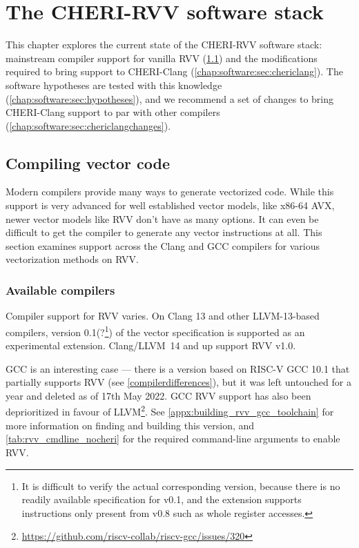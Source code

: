 \documentclass[../thesis]{subfiles}
\begin{document}
\chapter{The CHERI-RVV software stack\label{chap:software}}
This chapter explores the current state of the CHERI-RVV software stack: mainstream compiler support for vanilla RVV (\cref{chap:software:sec:compilersupport}) and the modifications required to bring support to CHERI-Clang (\cref{chap:software:sec:chericlang}).
The software hypotheses are tested with this knowledge (\cref{chap:software:sec:hypotheses}), and we recommend a set of changes to bring CHERI-Clang support to par with other compilers (\cref{chap:software:sec:chericlangchanges}).

\section{Compiling vector code}\label{chap:software:sec:compilersupport}
Modern compilers provide many ways to generate vectorized code.
While this support is very advanced for well established vector models, like x86-64 AVX, newer vector models like RVV don't have as many options.
It can even be difficult to get the compiler to generate any vector instructions at all.
This section examines support across the Clang and GCC compilers for various vectorization methods on RVV.

\subsection{Available compilers}
Compiler support for RVV varies.
On Clang 13 and other LLVM-13-based compilers, version 0.1(?\footnote{It is difficult to verify the actual corresponding version, because there is no readily available specification for v0.1, and the extension supports instructions only present from v0.8 such as whole register accesses.}) of the vector specification is supported as an experimental extension.
Clang/LLVM~14 and up support RVV v1.0.

GCC is an interesting case --- there is a version based on RISC-V GCC 10.1 that partially supports RVV (see \cref{compilerdifferences}), but it was left untouched for a year and deleted as of 17th May 2022.
GCC RVV support has also been deprioritized in favour of LLVM\footnote{\url{https://github.com/riscv-collab/riscv-gcc/issues/320}}.
See \cref{appx:building_rvv_gcc_toolchain} for more information on finding and building this version, and \cref{tab:rvv_cmdline_nocheri} for the required command-line arguments to enable RVV.
\end{document}
